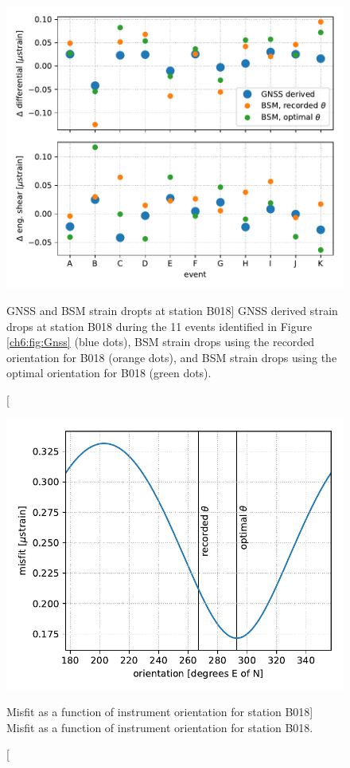\begin{figure}
\includegraphics{ch6/figures/fit.pdf}
\caption
[GNSS and BSM strain dropts at station B018]
{GNSS derived strain drops at station B018 during the 11
events identified in Figure \ref{ch6:fig:Gnss} (blue dots), BSM strain
drops using the recorded orientation for B018 (orange dots), and BSM
strain drops using the optimal orientation for B018 (green dots).}
\label{ch6:fig:Fit}
\end{figure}

\begin{figure}
\includegraphics{ch6/figures/misfit.pdf}
\caption
[Misfit as a function of instrument orientation for station
B018]
{Misfit as a function of instrument orientation for station
B018.}
\label{ch6:fig:Misfit}
\end{figure}

